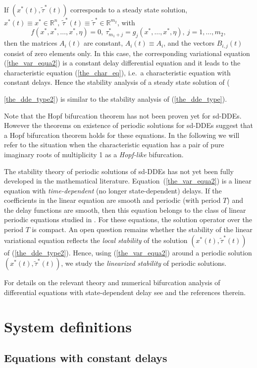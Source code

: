 \documentclass[10pt]{article}
\gdef \RR{{\mathbb R}}
\begin{document}
If $(x^*(t),\tilde{\tau}^*(t))$ corresponds to a steady state solution,
$x^*(t)\equiv x^*\in\RR^n,~
\tilde{\tau}^*(t)\equiv \tilde{\tau}^*\in\RR^{m_2}$,
with
\[
f(x^*,x^*,\ldots,x^*,\eta)=0,~\tau_{m_1+j}^*=g_j(x^*,\ldots,x^*,\eta),~
j=1,\ldots,m_2,
\]
then the matrices $A_i(t)$ are constant, $A_i(t)\equiv A_i$,
and the vectors $B_{i,j}(t)$ consist of zero elements only.
In this case, the corresponding variational equation (\ref{the_var_equa2})
is a constant delay differential equation and it 
leads to the characteristic equation (\ref{the_char_eq}), 
i.e.~a characteristic equation with constant delays. Hence the stability
analysis of a steady state solution of ({\ref{the_dde_type2}) 
is similar to the stability analysis of (\ref{the_dde_type}). 

Note that the Hopf bifurcation theorem has not been proven yet for
sd-DDEs. However 
the theorems on existence of periodic solutions for sd-DDEs suggest
that a Hopf bifurcation theorem holds for these  
equations.
In the following we will refer to the situation when 
the characteristic equation has a pair of pure imaginary roots of 
multiplicity 1 as a {\it Hopf-like} bifurcation.

The stability theory of periodic solutions of sd-DDEs 
has not yet been fully developed in the mathematical literature. 
Equation~(\ref{the_var_equa2}) is a 
linear equation with {\it time-dependent} (no longer state-dependent)
delays.
If the coefficients in the linear equation are smooth and periodic (with
period $T$) and the delay functions are 
smooth, then this equation belongs to the class of linear
periodic equations studied in \cite{Hale77a}.
For these equations, the solution operator over the
period $T$ is compact. An open question remains whether the stability of the 
linear variational equation reflects the {\it local stability} of the solution 
$(x^*(t),\tilde{\tau}^*(t))$ of (\ref{the_dde_type2}).
Hence, using (\ref{the_var_equa2}) around a periodic solution 
$(x^*(t),\tilde{\tau}^*(t))$, we study the {\it linearized stability}
of periodic solutions.

For details on the relevant theory and numerical bifurcation analysis
of differential equations with state-dependent delay see
\cite{luz01} and the references therein.

\section{System definitions}\label{code_example}

\subsection{Equations with constant delays}\label{sys_def1}

}
\end{document}
